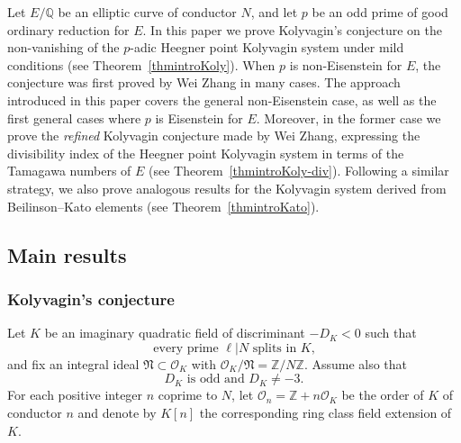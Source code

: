 \documentclass[10pt,reqno]{amsart}
\numberwithin{equation}{section}
\theoremstyle{plain}
\theoremstyle{definition}
\theoremstyle{definition}
\theoremstyle{plain}
\theoremstyle{plain}
\theoremstyle{plain}
\theoremstyle{plain}
\theoremstyle{plain}
\theoremstyle{plain}
\newcommand{\Z}{\mathbb{Z}}
\newcommand{\Q}{\mathbb{Q}}
\begin{document}
Let $E/\Q$ be an elliptic curve of conductor $N$, and let $p$ be an odd prime of good ordinary reduction for $E$. In this paper we prove Kolyvagin's conjecture on the non-vanishing of the $p$-adic Heegner point Kolyvagin system under mild conditions (see Theorem~\ref{thmintroKoly}). When $p$ is non-Eisenstein for $E$, the conjecture was first proved by Wei Zhang in many cases. The approach introduced in this paper covers the general non-Eisenstein case, as well as the first general cases where $p$ is Eisenstein for $E$. Moreover, in the former case we 
prove the \emph{refined} Kolyvagin conjecture made by Wei Zhang, expressing the divisibility index of the Heegner point Kolyvagin system in terms of the Tamagawa numbers of $E$ (see Theorem~\ref{thmintroKoly-div}). 
Following a similar strategy, we also prove analogous  results %
for the Kolyvagin system derived from Beilinson--Kato elements (see Theorem~\ref{thmintroKato}). 



\subsection{Main results}

\subsubsection*{Kolyvagin's conjecture} 

Let $K$ be an imaginary quadratic field of discriminant $-D_K<0$ such that
\begin{equation}\label{eq:intro-Heeg}
\textrm{every prime $\ell\vert N$ splits in $K$,}\tag{Heeg}
\end{equation} 
and fix an integral ideal $\mathfrak{N}\subset\mathcal{O}_K$ with $\mathcal{O}_K/\mathfrak{N}=\Z/N\Z$. Assume also that
\begin{equation}\label{eq:intro-disc}
\textrm{$D_K$ is odd and $D_K\neq -3$.}\tag{disc}
\end{equation}
For each positive integer $n$ coprime to $N$, let $\mathcal{O}_n=\Z+n\mathcal{O}_K$ be the order of $K$ of conductor $n$ and denote by  $K[n]$ the corresponding ring class field extension of $K$.
\end{document}
